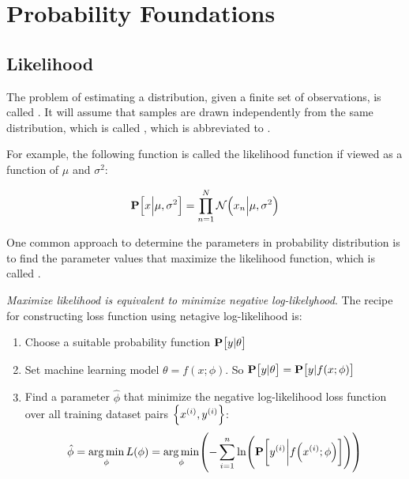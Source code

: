 \chapter{Probability Foundations}


\section{Likelihood}

\begin{definition}
    The problem of estimating a distribution, given a finite set of observations, is called . It will assume that samples are drawn independently from the same distribution, which is called , which is abbreviated to . 
\end{definition}

\begin{definition}
    For example, the following function is called the likelihood function if viewed as a function of $\mu$ and $\sigma^2$:
    
    \begin{equation}
        \probability{x \middle| \mu, \sigma^2} = \prod_{n=1}^N \normaldistributionwithparameter{x_n}{\mu}{\sigma^2}
    \end{equation}
    
    One common approach to determine the parameters in probability distribution is to find the parameter values that maximize the likelihood function, which is called .
\end{definition}

\emph{Maximize likelihood is equivalent to minimize negative log-likelyhood}. The recipe for constructing loss function using netagive log-likelihood is:
\begin{enumerate}
    \item Choose a suitable probability function $\probability{y|\theta}$
    \item Set machine learning model $\theta = f(x;\phi)$. So $\probability{y|\theta} = \probability{y|f(x;\phi)}$
    \item Find a parameter $\hat\phi$ that minimize the negative log-likelihood loss function over all training dataset pairs $\set{{x}^{(i)}, {y}^{(i)}}$: \begin{equation}
        \hat\phi = \argmin{\phi} L(\phi) = \argmin{\phi} \mleft( - \sum_{i=1}^n \ln \mleft(\probability{\selectonesample{y}{i} \middle| f\mleft(\selectonesample{x}{i};\phi \mright)} \mright)\mright)
    \end{equation}
\end{enumerate}

